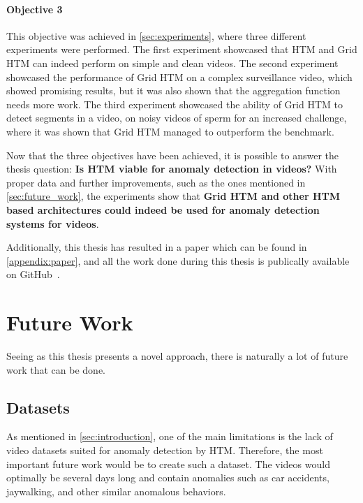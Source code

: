 \paragraph*{Objective 3} \emph{}
\par
This objective was achieved in \autoref{sec:experiments}, where three different experiments were performed. The first experiment showcased that HTM and Grid HTM can indeed perform on simple and clean videos. The second experiment showcased the performance of Grid HTM on a complex surveillance video, which showed promising results, but it was also shown that the aggregation function needs more work. The third experiment showcased the ability of Grid HTM to detect segments in a video, on noisy videos of sperm for an increased challenge, where it was shown that Grid HTM managed to outperform the benchmark.
\par
Now that the three objectives have been achieved, it is possible to answer the thesis question: \textbf{Is HTM viable for anomaly detection in videos?} With proper data and further improvements, such as the ones mentioned in \autoref{sec:future_work}, the experiments show that \textbf{Grid HTM and other HTM based architectures could indeed be used for anomaly detection systems for videos}.
\par
Additionally, this thesis has resulted in a paper which can be found in \autoref{appendix:paper}, and all the work done during this thesis is publically available on GitHub~\cite{master_thesis_github}.
\section{Future Work}
\label{sec:future_work}
Seeing as this thesis presents a novel approach, there is naturally a lot of future work that can be done.
\subsection*{Datasets}
As mentioned in \autoref{sec:introduction}, one of the main limitations is the lack of video datasets suited for anomaly detection by HTM. Therefore, the most important future work would be to create such a dataset. The videos would optimally be several days long and contain anomalies such as car accidents, jaywalking, and other similar anomalous behaviors.
\par
